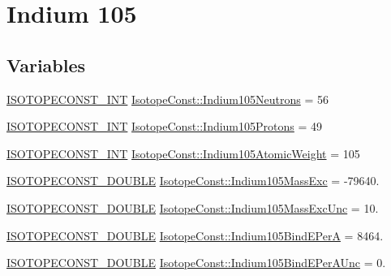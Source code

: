 \hypertarget{group___isotope_const-_indium-_in105}{}\section{Indium 105}
\label{group___isotope_const-_indium-_in105}
\subsection*{Variables}
\begin{DoxyCompactItemize}
\item 
\mbox{\hyperlink{group___isotope_const-_macros_ga5f18360b3e99483a35c32d789e62621c}{I\+S\+O\+T\+O\+P\+E\+C\+O\+N\+S\+T\+\_\+\+I\+NT}} \mbox{\hyperlink{group___isotope_const-_indium-_in105_ga1b3366b58e36a4f79c27c74f9a4f5fae}{Isotope\+Const\+::\+Indium105\+Neutrons}} = 56
\item 
\mbox{\hyperlink{group___isotope_const-_macros_ga5f18360b3e99483a35c32d789e62621c}{I\+S\+O\+T\+O\+P\+E\+C\+O\+N\+S\+T\+\_\+\+I\+NT}} \mbox{\hyperlink{group___isotope_const-_indium-_in105_gad29c1fe353c444f3b0497c7ac6b28a9b}{Isotope\+Const\+::\+Indium105\+Protons}} = 49
\item 
\mbox{\hyperlink{group___isotope_const-_macros_ga5f18360b3e99483a35c32d789e62621c}{I\+S\+O\+T\+O\+P\+E\+C\+O\+N\+S\+T\+\_\+\+I\+NT}} \mbox{\hyperlink{group___isotope_const-_indium-_in105_ga4f2d3c47a71f25913e9ab6e79de574d2}{Isotope\+Const\+::\+Indium105\+Atomic\+Weight}} = 105
\item 
\mbox{\hyperlink{group___isotope_const-_macros_ga8f45a7272ce02c0b4c65c44636ed719a}{I\+S\+O\+T\+O\+P\+E\+C\+O\+N\+S\+T\+\_\+\+D\+O\+U\+B\+LE}} \mbox{\hyperlink{group___isotope_const-_indium-_in105_ga42d9afde4d2eefc3d8d59a1fde401a6c}{Isotope\+Const\+::\+Indium105\+Mass\+Exc}} = -\/79640.
\item 
\mbox{\hyperlink{group___isotope_const-_macros_ga8f45a7272ce02c0b4c65c44636ed719a}{I\+S\+O\+T\+O\+P\+E\+C\+O\+N\+S\+T\+\_\+\+D\+O\+U\+B\+LE}} \mbox{\hyperlink{group___isotope_const-_indium-_in105_gaa17bebb6dd62589ed8da033df4a0eefc}{Isotope\+Const\+::\+Indium105\+Mass\+Exc\+Unc}} = 10.
\item 
\mbox{\hyperlink{group___isotope_const-_macros_ga8f45a7272ce02c0b4c65c44636ed719a}{I\+S\+O\+T\+O\+P\+E\+C\+O\+N\+S\+T\+\_\+\+D\+O\+U\+B\+LE}} \mbox{\hyperlink{group___isotope_const-_indium-_in105_gab9973d2b96b7e5bbfb13de0abd7a6bae}{Isotope\+Const\+::\+Indium105\+Bind\+E\+PerA}} = 8464.
\item 
\mbox{\hyperlink{group___isotope_const-_macros_ga8f45a7272ce02c0b4c65c44636ed719a}{I\+S\+O\+T\+O\+P\+E\+C\+O\+N\+S\+T\+\_\+\+D\+O\+U\+B\+LE}} \mbox{\hyperlink{group___isotope_const-_indium-_in105_gaeaab489a500c378cbbc220a0cc772876}{Isotope\+Const\+::\+Indium105\+Bind\+E\+Per\+A\+Unc}} = 0.

\end{DoxyCompactItemize}
